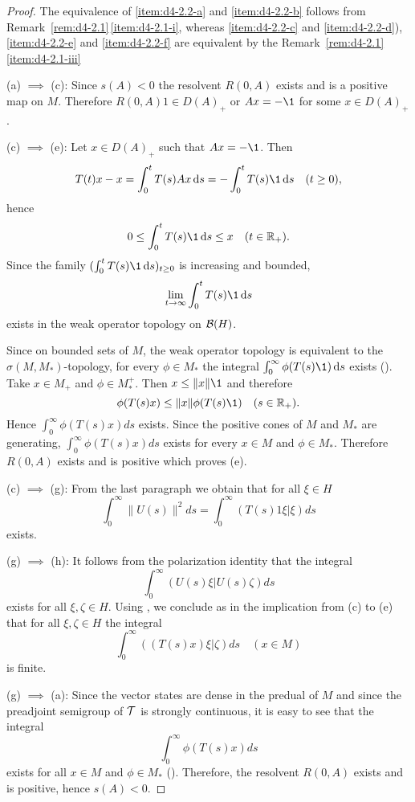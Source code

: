 \begin{proof}
The equivalence of \ref{item:d4-2.2-a} and \ref{item:d4-2.2-b} follows from Remark~\ref{rem:d4-2.1}\,\ref{item:d4-2.1-i}, whereas \ref{item:d4-2.2-c} and \ref{item:d4-2.2-d}), \resp  \ref{item:d4-2.2-e} and \ref{item:d4-2.2-f} are equivalent by the Remark~\ref{rem:d4-2.1}\,\ref{item:d4-2.1-iii}

(a) $\implies$ (c): Since $s(A) < 0$ the resolvent $R(0,A)$ exists and is a positive map on $M$.
Therefore $R(0,A)1 \in D(A)_{+}$ or $Ax = -\1$ for some $x \in D(A)_{+}$.

(c) $\implies$ (e): Let $x \in D(A)_{+}$ such that $Ax = -\1$.
Then
\[
T(t)x - x = \int_{0}^{t} T(s)Ax \ds = -\int_{0}^{t} T(s) \1 \ds \quad (t \geq 0),
\]
hence
\[
0 \leq \int_{0}^{t} T(s) \1 \ds \leq x \quad (t \in \R_{+}).
\]
Since the family $(\int_{0}^{t} T(s)\1 \ds)_{t \geq 0}$ is increasing and bounded, 
%
\[
	\lim_{t \to \infty} \int_{0}^{t} T(s) \1 \ds
\]
%
exists in the weak operator topology on $\mathcal{B}(H)$.

Since on bounded sets of $M$, the weak operator topology is equivalent to the $\sigma(M,M_{*})$-topology, for every $\phi \in M_{*}$ the integral $ \int_{0}^{\infty}\phi(T(s) \1) \ds $ exists (\citet[1.15.2.]{sakai:1971}).
Take $x \in M_{+}$ and $\phi \in M_{*}^{+}$.
Then $x \leq \|x\| \1$ and therefore
\[
	\phi(T(s)x) \leq \|x\|\phi(T(s) \1) \quad (s \in \R_{+}).
\]
Hence $\int_{0}^{\infty} \phi(T(s)x)ds$ exists.
Since the positive cones of $M$ and $M_{*}$ are generating, $\int_{0}^{\infty}\phi(T(s)x)ds$ exists for every $x \in M$ and $\phi \in M_{*}$.
Therefore $R(0,A)$ exists and is positive which proves (e).

(c) $\implies$ (g): From the last paragraph we obtain that for all $\xi \in H$
\[
\int_{0}^{\infty}\|U(s)\|^2ds = \int_{0}^{\infty}(T(s)1\xi|\xi)ds
\]
exists.

(g) $\implies$ (h): It follows from the polarization identity that the integral
\[
\int_{0}^{\infty}(U(s)\xi|U(s)\zeta)ds
\]
exists for all $\xi,\zeta \in H$.
Using \citet[Theorem III.4.2 and Theorem II.2.6]{takesaki:1979}, we conclude as in the implication from (c) to (e) that for all $\xi,\zeta \in H$ the integral
\[
\int_{0}^{\infty}((T(s)x)\xi|\zeta)ds \quad (x \in M)
\]
is finite.

(g) $\implies$ (a): Since the vector states are dense in the predual of $M$ and since the preadjoint semigroup of\/ $\mathcal{T}$ is strongly continuous, it is easy to see that the integral
\[
\int_{0}^{\infty} \phi(T(s)x)ds
\]
exists for all $x \in M$ and $\phi \in M_{*}$ (\citet[Theorem II.2.6]{takesaki:1979}).
Therefore, the resolvent $R(0,A)$ exists and is positive, hence $s(A) < 0$.
\end{proof}
